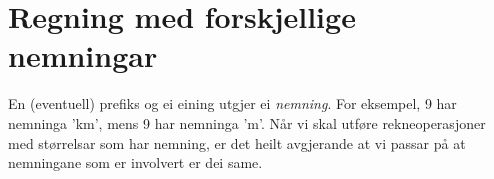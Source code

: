 \section{Regning med forskjellige nemningar \label{regnmforbenvn}}
En (eventuell) prefiks og ei eining utgjer ei \textit{nemning}. For eksempel, 9 har nemninga 'km', mens 9 har nemninga 'm'. Når vi skal utføre rekneoperasjoner med størrelsar som har nemning, er det heilt avgjerande at vi passar på at nemningane som er involvert er dei same. \regv

